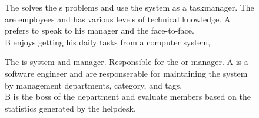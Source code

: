 \begin{figure}[h]
\begin{sadlistar}{\Astaff}
 The \astaff{} solves the \aclient[]s problems and use the system as a taskmanager.  
 The \astaff[] are employees and has various levels of technical knowledge.
 \astaff[c] A prefers to speak to his manager and the \aclient[] face-to-face.\\
\astaff[c] B enjoys getting his daily tasks from a computer system, 
 \end{sadlistar}
 \caption{}
 \label{fig:actorstaff}
 \end{figure}


\begin{figure}[h]
\begin{sadlistar}{\admin[c]}
 The \admin[] is system and \astaff[] manager.
 Responsible for the \hdesk[] or \astaff[] manager. 
 \admin[] A is a software engineer and are responserable for maintaining the system by management departments, category, and tags. \\
\admin[] B is the boss of the department and evaluate \staff members based on the statistics generated by the helpdesk.
 \end{sadlistar}
 \caption{}
 \label{fig:actoradmin}
 \end{figure}
